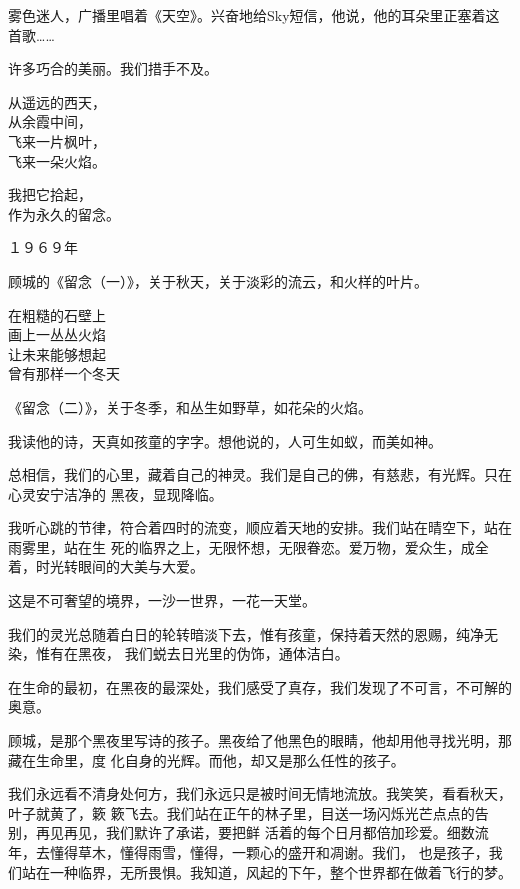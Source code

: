 \documentclass[12pt,a4paper]{article}
\begin{document}
		雾色迷人，广播里唱着《天空》。兴奋地给Sky短信，他说，他的耳朵里正塞着这首歌……

		许多巧合的美丽。我们措手不及。

	\endwriting



		\longpoem{}{}{}
		从遥远的西天，\\
		从余霞中间，\\
		飞来一片枫叶，\\
		飞来一朵火焰。

		我把它拾起，\\
		作为永久的留念。

		\hspace{4em} １９６９年
		\endlongpoem

		顾城的《留念（一）》，关于秋天，关于淡彩的流云，和火样的叶片。

		\longpoem{}{}{}
		在粗糙的石壁上 \\
		画上一丛丛火焰 \\
		让未来能够想起 \\
		曾有那样一个冬天
		\endlongpoem

		《留念（二）》，关于冬季，和丛生如野草，如花朵的火焰。

		我读他的诗，天真如孩童的字字。想他说的，人可生如蚁，而美如神。

		总相信，我们的心里，藏着自己的神灵。我们是自己的佛，有慈悲，有光辉。只在心灵安宁洁净的
	黑夜，显现降临。

		我听心跳的节律，符合着四时的流变，顺应着天地的安排。我们站在晴空下，站在雨雾里，站在生
	死的临界之上，无限怀想，无限眷恋。爱万物，爱众生，成全着，时光转眼间的大美与大爱。

		这是不可奢望的境界，一沙一世界，一花一天堂。

		我们的灵光总随着白日的轮转暗淡下去，惟有孩童，保持着天然的恩赐，纯净无染，惟有在黑夜，
	我们蜕去日光里的伪饰，通体洁白。

		在生命的最初，在黑夜的最深处，我们感受了真存，我们发现了不可言，不可解的奥意。

		顾城，是那个黑夜里写诗的孩子。黑夜给了他黑色的眼睛，他却用他寻找光明，那藏在生命里，度
	化自身的光辉。而他，却又是那么任性的孩子。

		我们永远看不清身处何方，我们永远只是被时间无情地流放。我笑笑，看看秋天，叶子就黄了，簌
	簌飞去。我们站在正午的林子里，目送一场闪烁光芒点点的告别，再见再见，我们默许了承诺，要把鲜
	活着的每个日月都倍加珍爱。细数流年，去懂得草木，懂得雨雪，懂得，一颗心的盛开和凋谢。我们，
	也是孩子，我们站在一种临界，无所畏惧。我知道，风起的下午，整个世界都在做着飞行的梦。
\end{document}
